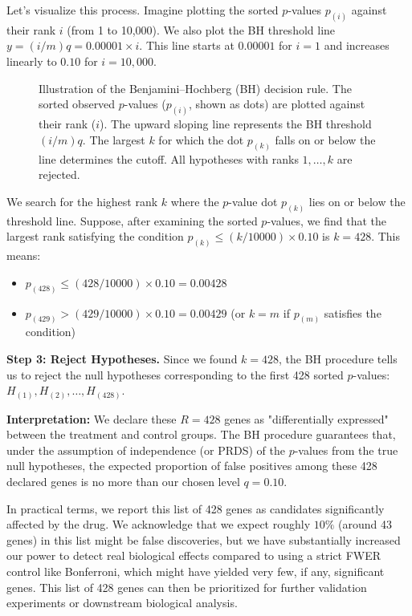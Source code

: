 \documentclass[12pt]{book}
\newcommand{\pvalue}{$p$-value}          %
\begin{document}
Let's visualize this process. Imagine plotting the sorted \pvalue s $p_{(i)}$ against their rank $i$ (from 1 to 10,000). We also plot the BH threshold line $y = (i/m)q = 0.00001 \times i$. This line starts at $0.00001$ for $i=1$ and increases linearly to $0.10$ for $i=10,000$.

\begin{figure}[ht]
  \centering
  \caption[Illustration of the BH procedure decision rule]{Illustration of the Benjamini–Hochberg (BH) decision rule. The sorted observed \pvalue s ($p_{(i)}$, shown as dots) are plotted against their rank ($i$). The upward sloping line represents the BH threshold $(i/m)q$. The largest $k$ for which the dot $p_{(k)}$ falls on or below the line determines the cutoff. All hypotheses with ranks $1, \dots, k$ are rejected.}
  \label{fig:bh_plot}
\end{figure}

We search for the highest rank $k$ where the \pvalue{} dot $p_{(k)}$ lies on or below the threshold line. Suppose, after examining the sorted \pvalue s, we find that the largest rank satisfying the condition $p_{(k)} \le (k/10000) \times 0.10$ is $k=428$. This means:
\begin{itemize}
    \item $p_{(428)} \le (428/10000) \times 0.10 = 0.00428$
    \item $p_{(429)} > (429/10000) \times 0.10 = 0.00429$ (or $k=m$ if $p_{(m)}$ satisfies the condition)
\end{itemize}

\textbf{Step 3: Reject Hypotheses.}
Since we found $k=428$, the BH procedure tells us to reject the null hypotheses corresponding to the first 428 sorted \pvalue s: $H_{(1)}, H_{(2)}, \dots, H_{(428)}$.

\textbf{Interpretation:}
We declare these $R=428$ genes as "differentially expressed" between the treatment and control groups. The BH procedure guarantees that, under the assumption of independence (or PRDS) of the \pvalue s from the true null hypotheses, the expected proportion of false positives among these 428 declared genes is no more than our chosen level $q=0.10$.

In practical terms, we report this list of 428 genes as candidates significantly affected by the drug. We acknowledge that we expect roughly $10\%$ (around 43 genes) in this list might be false discoveries, but we have substantially increased our power to detect real biological effects compared to using a strict FWER control like Bonferroni, which might have yielded very few, if any, significant genes. This list of 428 genes can then be prioritized for further validation experiments or downstream biological analysis.
\end{document}
